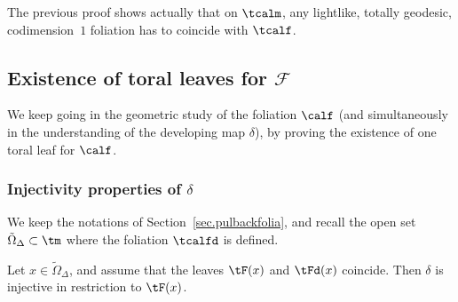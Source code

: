 \begin{rema}\label{rem.codimension1}
The previous proof shows actually that on $\tcalm$, any lightlike, totally geodesic, codimension~$1$ foliation has to coincide with $\tcalf$.
\end{rema}


\subsection{Existence of toral leaves for \texorpdfstring{${\mathcal F}$}{F}}\label{sec.toral}
We keep going in the geometric study of the foliation $\calf$ (and simultaneously in the understanding of the developing map $\delta$), by proving the existence of one toral leaf for $\calf$.
\subsubsection{Injectivity properties of \texorpdfstring{$\delta$}{delta}}\label{sec.injectivity-leave}
We keep the notations of Section~\ref{sec.pulbackfolia}, and recall the open set $\tilde{\Omega}_{\Delta} \subset \tm$ where the foliation $\tcalfd$ is defined.
\begin{lemm}\label{lem.injective}
Let $x \in \tilde{\Omega}_{\Delta}$, and assume that the leaves $\tF(x)$ and $\tFd(x)$ coincide. Then $\delta$ is injective in restriction to $\tF(x)$.
\end{lemm}

